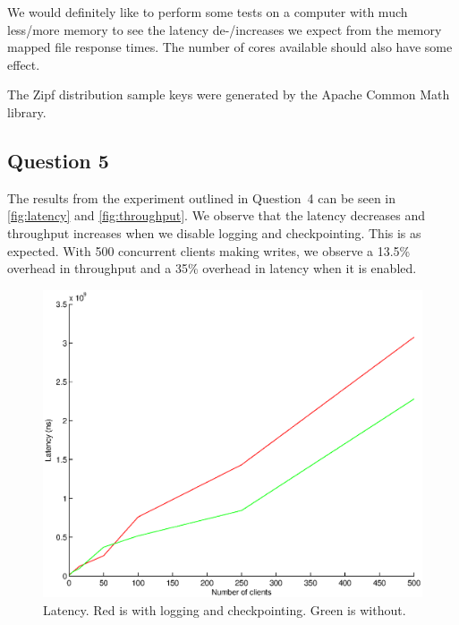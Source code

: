 \documentclass[a4paper]{article}
\begin{document}
We would definitely like to perform some tests on a computer with much
less/more memory to see the latency de-/increases we expect from the memory
mapped file response times. The number of cores available should also have some
effect.

The Zipf distribution sample keys were generated by the Apache Common Math
library.

\subsection{Question 5}

The results from the experiment outlined in Question~4 can be seen in
\autoref{fig:latency} and \autoref{fig:throughput}. We observe that the latency
decreases and throughput increases when we disable logging and checkpointing.
This is as expected. With 500 concurrent clients making writes, we observe a
13.5\% overhead in throughput and a 35\% overhead in latency when it is
enabled.

\begin{figure}[h]
    \centering
    \includegraphics[scale=0.7]{latency}
    \caption{Latency. Red is with logging and checkpointing. Green is without.}
    \label{fig:latency}
\end{figure}
\end{document}
